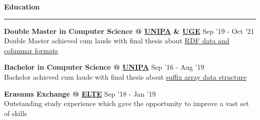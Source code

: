 \documentclass[11pt,letterpaper]{article}
\begin{document}
\begin{justify}
      {\large \textbf{Education} \strut}
      \hrule
      \begin{itemize}[label={}, leftmargin=0pt]
            \begin{item}
                  \textbf{Double Master in Computer Science @ \href{https://www.unipa.it/mobilita/en/}{UNIPA} \& \href{https://www.univ-gustave-eiffel.fr/en/}{UGE}}
                  \hfill
                  Sep '19 - Oct '21
                  \vspace{0.05cm}
                  \\
                  Double Master achieved cum laude with final thesis about \href{https://raw.githubusercontent.com/dariocurr/thesis/main/thesis.pdf}{RDF data and columnar formats}
            \end{item}
            \begin{item}
                  \textbf{Bachelor in Computer Science @ \href{https://www.unipa.it/mobilita/en/}{UNIPA}}
                  \hfill
                  Sep '16 - Aug '19
                  \vspace{0.05cm}
                  \\
                  Bachelor achieved cum laude with final thesis about \href{https://dariocurr.github.io/assets/img/poster.png}{suffix array data structure}
            \end{item}
            \begin{item}
                  \textbf{Erasmus Exchange @ \href{https://www.elte.hu/en/}{ELTE}}
                  \hfill
                  Sep '18 - Jan '19
                  \vspace{0.05cm}
                  \\
                  Outstanding study experience which gave the opportunity to improve a vast set of skills
            \end{item}
      \end{itemize}


\end{justify}
\end{document}
